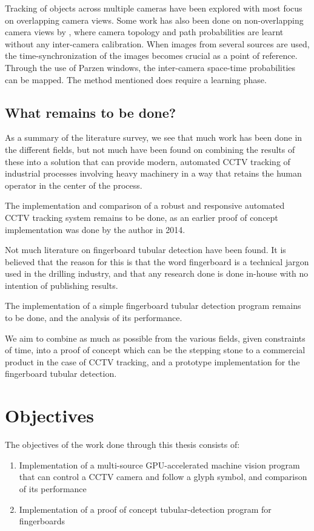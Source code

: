 Tracking of objects across multiple cameras have been explored with most focus on overlapping camera views. Some work has also been done on non-overlapping camera views by \citet{javed03}, where camera topology and path probabilities are learnt without any inter-camera calibration. When images from several sources are used, the time-synchronization of the images becomes crucial as a point of reference. Through the use of Parzen windows, the inter-camera space-time probabilities can be mapped. The method mentioned does require a learning phase.

\subsection{What remains to be done?}
As a summary of the literature survey, we see that much work has been done in the different fields, but not much have been found on combining the results of these into a solution that can provide modern, automated CCTV tracking of industrial processes involving heavy machinery in a way that retains the human operator in the center of the process.

The implementation and comparison of a robust and responsive automated CCTV tracking system remains to be done, as an earlier proof of concept implementation was done by the author in 2014.

Not much literature on fingerboard tubular detection have been found. It is believed that the reason for this is that the word fingerboard is a technical jargon used in the drilling industry, and that any research done is done in-house with no intention of publishing results.

The implementation of a simple fingerboard tubular detection program remains to be done, and the analysis of its performance.

We aim to combine as much as possible from the various fields, given constraints of time, into a proof of concept which can be the stepping stone to a commercial product in the case of CCTV tracking, and a prototype implementation for the fingerboard tubular detection.

\section{Objectives}
The objectives of the work done through this thesis consists of:
\begin{enumerate}
  \item Implementation of a multi-source GPU-accelerated machine vision program that can control a CCTV camera and follow a glyph symbol, and comparison of its performance
  \item Implementation of a proof of concept tubular-detection program for fingerboards
\end{enumerate}

